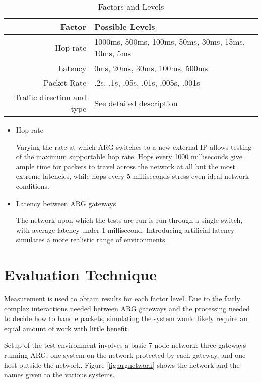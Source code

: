 \begin{table}
\begin{center}
	\caption{Factors and Levels}
	\label{tbl:factors}
	
	\begin{tabular}{r|l}
	Factor & Possible Levels \\
	\hline
	Hop rate & 1000ms, 500ms, 100ms, 50ms, 30ms, 15ms, 10ms, 5ms\\
	Latency & 0ms, 20ms, 30ms, 100ms, 500ms\\
	Packet Rate & .2s, .1s, .05s, .01s, .005s, .001s\\
	Traffic direction and type & See detailed description
	\end{tabular}
\end{center}
\end{table}

\begin{itemize}
\item Hop rate
	\par Varying the rate at which \ac{ARG} switches to a new external \ac{IP} allows testing of the maximum supportable hop rate. Hops every 1000 milliseconds give ample time for packets to travel across the network at all but the most extreme latencies, while hops every 5 milliseconds stress even ideal network conditions.

\item Latency between \ac{ARG} gateways
	\par The network upon which the tests are run is run through a single switch, with average latency under 1 millisecond. Introducing artificial latency simulates a more realistic range of environments. 
\end{itemize}

\section{Evaluation Technique}
\label{sec:eval_technique}
\par Measurement is used to obtain results for each factor level. Due to the fairly complex interactions needed between \ac{ARG} gateways and the processing needed to decide how to handle packets, simulating the system would likely require an equal amount of work with little benefit.

\par Setup of the test environment involves a basic 7-node network: three gateways running \ac{ARG}, one system on the network protected by each gateway, and one host outside the network. Figure \ref{fig:argnetwork} shows the network and the names given to the various systems.

